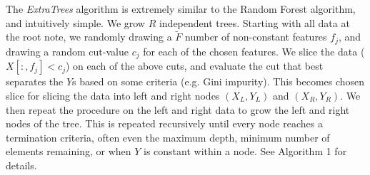 \documentclass[10pt,conference]{IEEEtran}
\begin{document}
  The \textit{ExtraTrees} algorithm is extremely similar to the Random Forest algorithm, and intuitively simple. We grow $R$ independent trees. Starting with all data at the root note, we randomly drawing a $\tilde{F}$ number of non-constant features $f_j$, and drawing a random cut-value $c_j$ for each of the chosen features. We slice the data ($X[:, f_j] < c_j$) on each of the above cuts, and evaluate the cut that best separates the $Y$s based on some criteria (e.g. Gini impurity). This becomes chosen slice for slicing the data into left and right nodes $(X_L, Y_L)$ and $(X_R, Y_R)$. We then repeat the procedure on the left and right data to grow the left and right nodes of the tree. This is repeated recursively until every node reaches a termination criteria, often even the maximum depth, minimum number of elements remaining, or when $Y$ is constant within a node. See Algorithm 1 for details.
\end{document}
